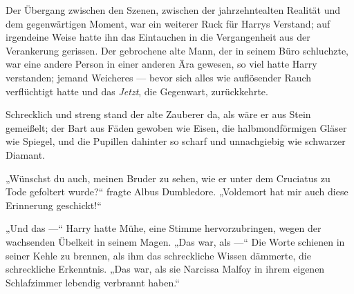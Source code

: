 %
Der Übergang zwischen den Szenen, zwischen der jahrzehntealten Realität und dem gegenwärtigen Moment, war ein weiterer Ruck für Harrys Verstand; auf irgendeine Weise hatte ihn das Eintauchen in die Vergangenheit aus der Verankerung gerissen. Der gebrochene alte Mann, der in seinem Büro schluchzte, war eine andere Person in einer anderen Ära gewesen, so viel hatte Harry verstanden; jemand Weicheres — bevor sich alles wie auflösender Rauch verflüchtigt hatte und das \emph{Jetzt}, die Gegenwart, zurückkehrte.

Schrecklich und streng stand der alte Zauberer da, als wäre er aus Stein gemeißelt; der Bart aus Fäden gewoben wie Eisen, die halbmondförmigen Gläser wie Spiegel, und die Pupillen dahinter so scharf und unnachgiebig wie schwarzer Diamant.

„Wünschst du auch, meinen Bruder zu sehen, wie er unter dem Cruciatus zu Tode gefoltert wurde?“ fragte Albus Dumbledore.
„Voldemort hat mir auch diese Erinnerung geschickt!“

„Und das —“ Harry hatte Mühe, eine Stimme hervorzubringen, wegen der wachsenden Übelkeit in seinem Magen.
„Das war, als —“
Die Worte schienen in seiner Kehle zu brennen, als ihm das schreckliche Wissen dämmerte, die schreckliche Erkenntnis.
„Das war, als sie Narcissa Malfoy in ihrem eigenen Schlafzimmer lebendig verbrannt haben.“


